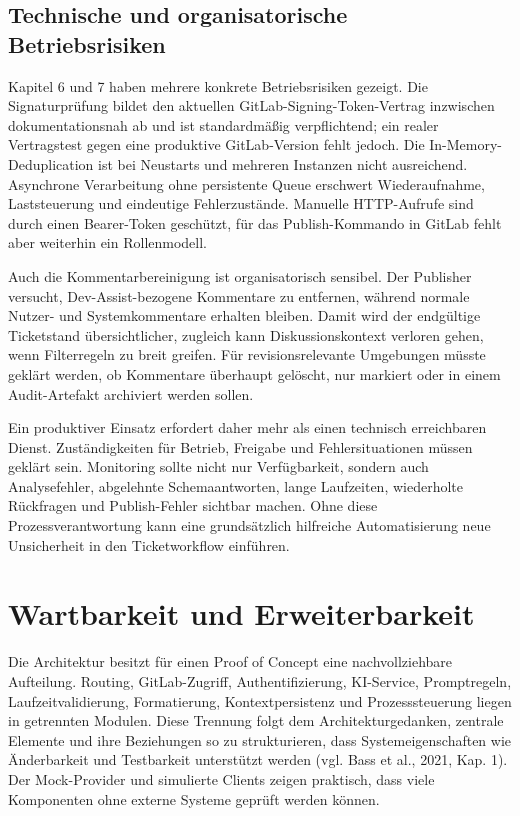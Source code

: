 \subsection{Technische und organisatorische Betriebsrisiken}

Kapitel 6 und 7 haben mehrere konkrete Betriebsrisiken gezeigt. Die Signaturprüfung bildet den aktuellen GitLab-Signing-Token-Vertrag inzwischen dokumentationsnah ab und ist standardmäßig verpflichtend; ein realer Vertragstest gegen eine produktive GitLab-Version fehlt jedoch. Die In-Memory-Deduplication ist bei Neustarts und mehreren Instanzen nicht ausreichend. Asynchrone Verarbeitung ohne persistente Queue erschwert Wiederaufnahme, Laststeuerung und eindeutige Fehlerzustände. Manuelle HTTP-Aufrufe sind durch einen Bearer-Token geschützt, für das Publish-Kommando in GitLab fehlt aber weiterhin ein Rollenmodell.

Auch die Kommentarbereinigung ist organisatorisch sensibel. Der Publisher versucht, Dev-Assist-bezogene Kommentare zu entfernen, während normale Nutzer- und Systemkommentare erhalten bleiben. Damit wird der endgültige Ticketstand übersichtlicher, zugleich kann Diskussionskontext verloren gehen, wenn Filterregeln zu breit greifen. Für revisionsrelevante Umgebungen müsste geklärt werden, ob Kommentare überhaupt gelöscht, nur markiert oder in einem Audit-Artefakt archiviert werden sollen.

Ein produktiver Einsatz erfordert daher mehr als einen technisch erreichbaren Dienst. Zuständigkeiten für Betrieb, Freigabe und Fehlersituationen müssen geklärt sein. Monitoring sollte nicht nur Verfügbarkeit, sondern auch Analysefehler, abgelehnte Schemaantworten, lange Laufzeiten, wiederholte Rückfragen und Publish-Fehler sichtbar machen. Ohne diese Prozessverantwortung kann eine grundsätzlich hilfreiche Automatisierung neue Unsicherheit in den Ticketworkflow einführen.

\section{Wartbarkeit und Erweiterbarkeit}

Die Architektur besitzt für einen Proof of Concept eine nachvollziehbare Aufteilung. Routing, GitLab-Zugriff, Authentifizierung, KI-Service, Promptregeln, Laufzeitvalidierung, Formatierung, Kontextpersistenz und Prozesssteuerung liegen in getrennten Modulen. Diese Trennung folgt dem Architekturgedanken, zentrale Elemente und ihre Beziehungen so zu strukturieren, dass Systemeigenschaften wie Änderbarkeit und Testbarkeit unterstützt werden (vgl. Bass et al., 2021, Kap. 1). Der Mock-Provider und simulierte Clients zeigen praktisch, dass viele Komponenten ohne externe Systeme geprüft werden können.

